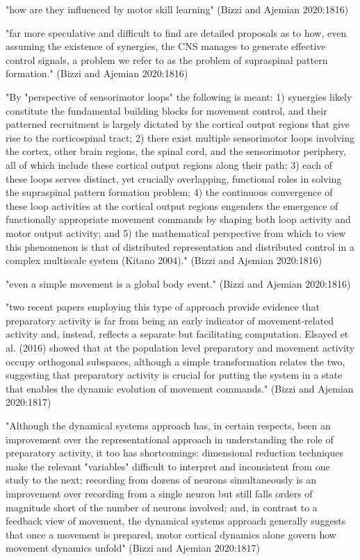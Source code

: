 \documentclass[../main.tex]{subfiles}
\begin{document}
{{"how are they influenced by motor skill learning" (Bizzi and Ajemian 2020:1816)

"far more speculative and difficult to find are detailed proposals as to how, even assuming the existence of synergies, the CNS manages to generate effective control signals, a problem we refer to as the problem of supraspinal pattern formation." (Bizzi and Ajemian 2020:1816)

"By "perspective of sensorimotor loops" the following is meant: 1) synergies likely constitute the fundamental building blocks for movement control, and their patterned recruitment is largely dictated by the cortical output regions that give rise to the corticospinal tract; 2) there exist multiple sensorimotor loops involving the cortex, other brain regions, the spinal cord, and the sensorimotor periphery, all of which include these cortical output regions along their path; 3) each of these loops serves distinct, yet crucially overlapping, functional roles in solving the supraspinal pattern formation problem; 4) the continuous convergence of these loop activities at the cortical output regions engenders the emergence of functionally appropriate movement commands by shaping both loop activity and motor output activity; and 5) the mathematical perspective from which to view this phenomenon is that of distributed representation and distributed control in a complex multiscale system (Kitano 2004)." (Bizzi and Ajemian 2020:1816)

"even a simple movement is a global body event." (Bizzi and Ajemian 2020:1816)

"two recent papers employing this type of approach provide evidence that preparatory activity is far from being an early indicator of movement-related activity and, instead, reflects a separate but facilitating computation. Elsayed et al. (2016) showed that at the population level preparatory and movement activity occupy orthogonal subspaces, although a simple transformation relates the two, suggesting that preparatory activity is crucial for putting the system in a state that enables the dynamic evolution of movement commands." (Bizzi and Ajemian 2020:1817)

"Although the dynamical systems approach has, in certain respects, been an improvement over the representational approach in understanding the role of preparatory activity, it too has shortcomings: dimensional reduction techniques make the relevant "variables" difficult to interpret and inconsistent from one study to the next; recording from dozens of neurons simultaneously is an improvement over recording from a single neuron but still falls orders of magnitude short of the number of neurons involved; and, in contrast to a feedback view of movement, the dynamical systems approach generally suggests that once a movement is prepared, motor cortical dynamics alone govern how movement dynamics unfold" (Bizzi and Ajemian 2020:1817)

}}
\end{document}
